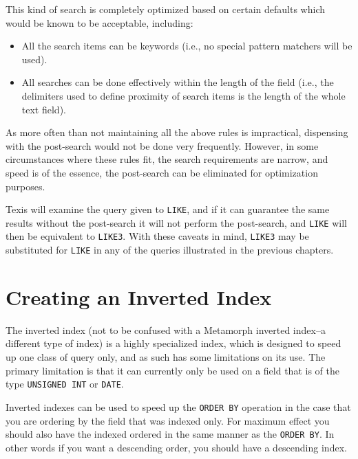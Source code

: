 This kind of search is completely optimized based on certain defaults
which would be known to be acceptable, including:

\begin{itemize}
\item All the search items can be keywords (i.e., no special
pattern matchers will be used).

\item All searches can be done effectively within the length of the
field (i.e., the delimiters used to define proximity of search items
is the length of the whole text field).
\end{itemize}

As more often than not maintaining all the above rules is impractical,
dispensing with the post-search would not be done very frequently.
However, in some circumstances where these rules fit, the search
requirements are narrow, and speed is of the essence, the post-search
can be eliminated for optimization purposes.

Texis will examine the query given to \verb`LIKE`, and if it can
guarantee the same results without the post-search it will not perform
the post-search, and \verb`LIKE` will then be equivalent to
\verb`LIKE3`.  With these caveats in mind, \verb`LIKE3` may be
substituted for \verb`LIKE` in any of the queries illustrated in the
previous chapters.

\section{Creating an Inverted Index}

The inverted index (not to be confused with a Metamorph inverted
index--a different type of index) is a highly specialized index, which
is designed to speed up one class of query only, and as such has some
limitations on its use.  The primary limitation is that it can
currently only be used on a field that is of the type {\tt UNSIGNED INT} or
\verb`DATE`.

Inverted indexes can be used to speed up the {\tt ORDER BY} operation in
the case that you are ordering by the field that was indexed only.
For maximum effect you should also have the indexed ordered in the
same manner as the {\tt ORDER BY}.  In other words if you want a descending
order, you should have a descending index.

